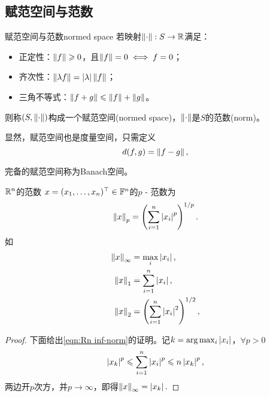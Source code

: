 \subsection{赋范空间与范数}

\begin{definition}
    {赋范空间与范数}{normed space}
    若映射$\left\lVert\cdot\right\rVert:S\to\mathbb R$满足：
    \begin{itemize}
        \item 正定性：$\left\lVert f\right\rVert\geqslant 0$，且$\left\lVert f\right\rVert=0\iff f=0$；
        \item 齐次性：$\left\lVert\lambda f\right\rVert=\left\lvert\lambda\right\rvert\left\lVert f\right\rVert$；
        \item 三角不等式：$\left\lVert f+g\right\rVert\leqslant\left\lVert f\right\rVert+\left\lVert g\right\rVert$。
    \end{itemize}
    则称$(S,\left\lVert\cdot\right\rVert)$构成一个赋范空间(normed space)，$\left\lVert\cdot\right\rVert$是$S$的范数(norm)。
\end{definition}

\begin{corollary}
    显然，赋范空间也是度量空间，只需定义
    \[
        d(f,g)=\left\lVert f-g\right\rVert,
    \]
\end{corollary}
\begin{remark}
    完备的赋范空间称为Banach空间。
\end{remark}

\begin{example}
    {$\mathbb R^n$的范数}{}
    $x=(x_1,\ldots,x_n)^\top\in\mathbb F^n$的$p$ - 范数为
    \[
        \left\lVert x\right\rVert_p=\left(\sum_{i=1}^n\left\lvert x_i\right\rvert^p\right)^{1/p}.
    \]
    如
    \begin{subequations}
        \begin{align}
            \label{eqn:Rn inf-norm}
            \left\lVert x\right\rVert_\infty&=\max_{i}\left\lvert x_i\right\rvert,\\
            \label{eqn:Rn 1-norm}
            \left\lVert x\right\rVert_1&=\sum_{i=1}^n\left\lvert x_i\right\rvert,\\
            \label{eqn:Rn 2-norm}
            \left\lVert x\right\rVert_2&=\left(\sum_{i=1}^n\left\lvert x_i\right\rvert^2\right)^{1/2},
        \end{align}
    \end{subequations}
    \begin{proof}
        下面给出\eqref{eqn:Rn inf-norm}的证明。记$k=\arg\max_i\left\lvert x_i\right\rvert$，$\forall p>0$
        \[
            \left\lvert x_k\right\rvert^p\leqslant\sum_{i=1}^n\left\lvert x_i\right\rvert^p\leqslant n\left\lvert x_k\right\rvert^p,
        \]
        两边开$p$次方，并$p\to\infty$，即得$\left\lVert x\right\rVert_\infty=\left\lvert x_k\right\rvert.$
    \end{proof}
\end{example}

